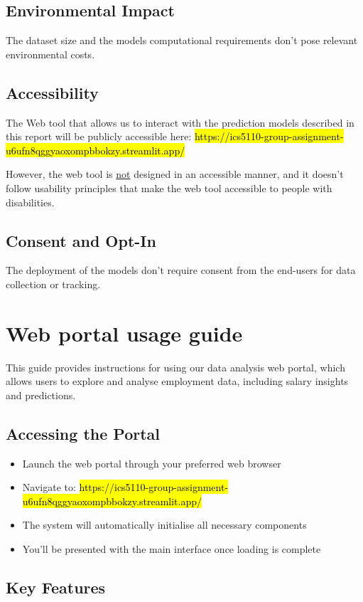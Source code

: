 \documentclass[11pt,a4paper]{article}
\newcommand{\hint}[1]{%
  \begingroup
  \sethlcolor{yellow!30}%
  \hl{#1}%
  \endgroup
}
\begin{document}
\subsection{Environmental Impact}
The dataset size and the models computational requirements don’t pose relevant environmental costs. 
\subsection{Accessibility}
The Web tool that allows us to interact with the prediction models described in this report will be publicly accessible here: 
\hint{https://ics5110-group-assignment-u6ufn8qggyaoxompbbokzy.streamlit.app/}
However, the web tool is \uline{not} designed in an accessible manner, and it doesn’t follow usability principles that make the web tool accessible to people with disabilities. 
\subsection{Consent and Opt-In}
The deployment of the models don’t require consent from the end-users for data collection or tracking.

\section{Web portal usage guide}
This guide provides instructions for using our data analysis web portal, which allows users to explore and analyse employment data, including salary insights and predictions.

\subsection{Accessing the Portal}
\begin{itemize}
\item Launch the web portal through your preferred web browser
\item Navigate to: \hint{https://ics5110-group-assignment-u6ufn8qggyaoxompbbokzy.streamlit.app/}
\item The system will automatically initialise all necessary components
\item You'll be presented with the main interface once loading is complete
\end{itemize}

\subsection{Key Features}
\end{document}
